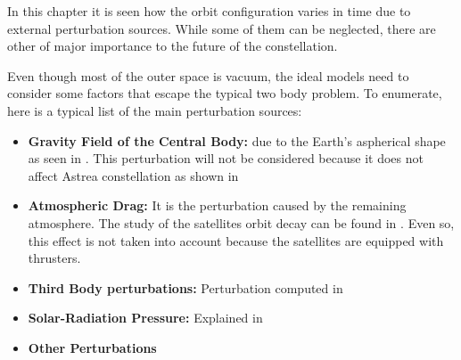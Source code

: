 \label{TypesPerturb}

In this chapter it is seen how the orbit configuration varies in time due to external perturbation sources. While some of them can be neglected, there are other of major importance to the future of the constellation.

Even though most of the outer space is vacuum, the ideal models need to consider some factors that escape the typical two body problem. To enumerate, here is a typical list of the main perturbation sources:

\begin{itemize}
\item \textbf{Gravity Field of the Central Body:} due to the Earth's aspherical shape as seen in \cite[Chapter 4, Section 1]{annex1}. This perturbation will not be considered because it does not affect Astrea constellation as shown in \cite[Chapter 4, Section 2]{annex1}
\item \textbf{Atmospheric Drag:} It is the perturbation caused by the remaining atmosphere. The study of the satellites orbit decay can be found in \cite[Chapter 4, Section 2]{annex1}. Even so, this effect is not taken into account because the satellites are equipped with thrusters.
\item \textbf{Third Body perturbations:} Perturbation computed in \cite[Chapter 4, Section 1]{annex1}
\item \textbf{Solar-Radiation Pressure:} Explained in \cite[Chapter 4, Section 2]{annex1}
\item \textbf{Other Perturbations}
\end{itemize}